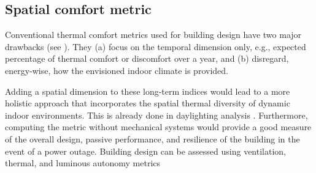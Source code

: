 
\subsection{Spatial comfort metric}

Conventional thermal comfort metrics used for building design have two major drawbacks (see ). They (a) focus on the temporal dimension only, e.g., expected percentage of thermal comfort or discomfort over a year, and (b) disregard, energy-wise, how the envisioned indoor climate is provided.

Adding a spatial dimension to these long-term indices would lead to a more holistic approach that incorporates the spatial thermal diversity of dynamic indoor environments. This is already done in daylighting analysis \citep{Heschong2012, Reinhart2006}. Furthermore, computing the metric without mechanical systems would provide a good measure of the overall design, passive performance, and resilience of the building in the event of a power outage. Building design can be assessed using ventilation, thermal, and luminous autonomy metrics \citep{Ko2018}





